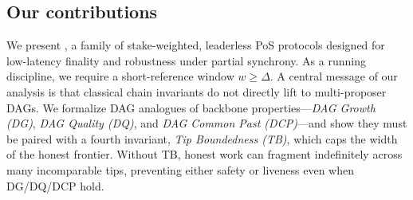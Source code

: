 \vspace{-.3cm}

\subsection{Our contributions}
\vspace{-.2cm}




We present \Proj, a family of stake-weighted, leaderless PoS protocols designed for low-latency finality and robustness under partial synchrony.
As a running discipline, we require a short-reference window $w\ge\Delta$. %
A central message of our analysis is that classical chain invariants do not directly lift to multi-proposer DAGs. We formalize DAG analogues of backbone properties---\emph{DAG Growth (DG)}, \emph{DAG Quality (DQ)}, and \emph{DAG Common Past (DCP)}---and show they must be paired with a fourth invariant, \emph{Tip Boundedness (TB)}, which caps the width of the honest frontier. Without TB, honest work can fragment indefinitely across many incomparable tips, preventing either safety or liveness even when DG/DQ/DCP hold.
\vspace{-.3cm}

